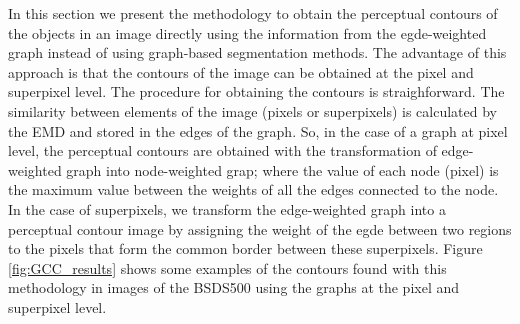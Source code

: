 In this section we present the methodology to obtain the perceptual contours of the objects in an image directly using the information from the egde-weighted graph instead of using graph-based segmentation methods. The advantage of this approach is that the contours of the image can be obtained at the pixel and superpixel level. The procedure for obtaining the contours is straighforward. The similarity between elements of the image (pixels or superpixels) is calculated by the EMD and stored in the edges of the graph. So, in the case of a graph at pixel level, the perceptual contours are obtained with the transformation of edge-weighted graph into node-weighted grap; where the value of each node (pixel) is the maximum value between the weights of all the edges connected to the node. In the case of superpixels, we transform the edge-weighted graph into a perceptual contour image by assigning the weight of the egde between two regions to the pixels that form the common border between these superpixels. Figure \ref{fig:GCC_results}  shows some examples of the contours found with this methodology in images of the BSDS500 using the graphs at the pixel and superpixel level.


